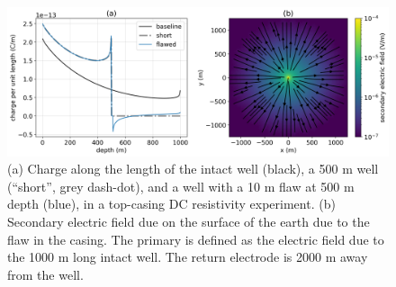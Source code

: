 \begin{figure}
    \begin{center}
    \includegraphics[width=\textwidth]{figures/casing_charge.png}
    \end{center}
\caption{
    (a) Charge along the length of the intact well (black),
    a 500 m well (``short'', grey dash-dot), and
    a well with a 10 m flaw at 500 m depth (blue),
    in a top-casing DC resistivity experiment.
    (b) Secondary electric field due on the surface of the earth due to the
    flaw in the casing. The primary is
    defined as the electric field due to the 1000 m long intact well. The return electrode
    is 2000 m away from the well.
}
\label{fig:casing_charge}
\end{figure}
